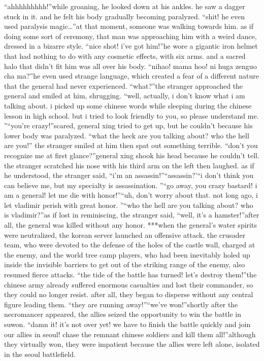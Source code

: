 “ahhhhhhhhh!”while groaning, he looked down at his ankles.
 he saw a dagger stuck in it.
 and he felt his body gradually becoming paralyzed.
“shit! he even used paralysis magic…”at that moment, someone was walking towards him.
as if doing some sort of ceremony, that man was approaching him with a weird dance, dressed in a bizarre style.
“nice shot! i’ve got him!”he wore a gigantic iron helmet that had nothing to do with any cosmetic effects, with six arms.
 and a sacred halo that didn’t fit him was all over his body.
“nihao! mama hoo! ni huga zenguo cha ma?”he even used strange language, which created a fear of a different nature that the general had never experienced.
“what?”the stranger approached the general and smiled at him, shrugging.
“well, actually, i don’t know what i am talking about.
 i picked up some chinese words while sleeping during the chinese lesson in high school.
 but i tried to look friendly to you, so please understand me.
”“you’re crazy!”scared, general xing tried to get up, but he couldn’t because his lower body was paralyzed.
“what the heck are you talking about? who the hell are you!”
the stranger smiled at him then spat out something terrible.
“don’t you recognize me at first glance?”general xing shook his head because he couldn’t tell.
 the stranger scratched his nose with his third arm on the left then laughed.
as if he understood, the stranger said, “i’m an assassin!”“assassin?’“i don’t think you can believe me, but my specialty is assassination.
”“go away, you crazy bastard! i am a general! let me die with honor!”“uh, don’t worry about that.
 not long ago, i let vladimir perish with great honor.
”“who the hell are you talking about? who is vladimir?”as if lost in reminiscing, the stranger said, “well, it’s a hamster!”after all, the general was killed without any honor.
***when the general’s water spirits were neutralized, the korean server launched an offensive attack.
the crusader team, who were devoted to the defense of the holes of the castle wall, charged at the enemy, and the world tree camp players, who had been inevitably holed up inside the invisible barriers to get out of the striking range of the enemy, also resumed fierce attacks.
“the tide of the battle has turned! let’s destroy them!”the chinese army already suffered enormous casualties and lost their commander, so they could no longer resist.
 after all, they began to disperse without any central figure leading them.
“they are running away!”“we’ve won!”shortly after the necromancer appeared, the allies seized the opportunity to win the battle in suwon.
“damn it! it’s not over yet! we have to finish the battle quickly and join our allies in seoul! chase the remnant chinese soldiers and kill them all!”although they virtually won, they were impatient because the allies were left alone, isolated in the seoul battlefield.

